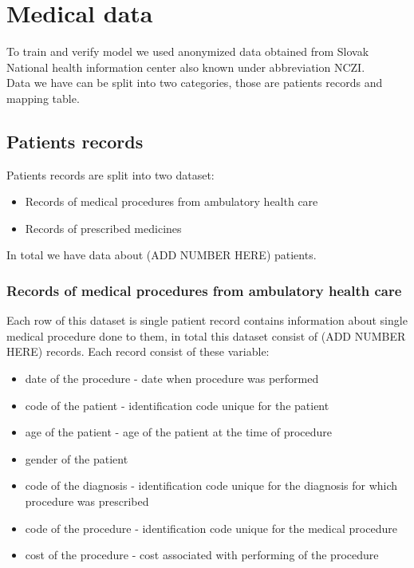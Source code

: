 
\chapter{Medical data} \label{chap:data}

To train and verify model we used anonymized data obtained from Slovak National health information center also known under abbreviation NCZI. 
\\

Data we have can be split into two categories, those are patients records and mapping table. 

\section{Patients records}

Patients records are split into two dataset:
\begin{itemize}
	\item Records of medical procedures from ambulatory health care
	\item Records of prescribed medicines
\end{itemize}

In total we have data about (ADD NUMBER HERE) patients.

\subsection{Records of medical procedures from ambulatory health care}

Each row of this dataset is single patient record contains information about single medical procedure done to them, in total this dataset consist of (ADD NUMBER HERE) records. Each record consist of these variable:
\begin{itemize}
	\item date of the procedure - date when procedure was performed
	\item code of the patient - identification code unique for the patient
	\item age of the patient - age of the patient at the time of procedure
	\item gender of the patient
	\item code of the diagnosis - identification code unique for the diagnosis for which procedure was prescribed
	\item code of the procedure - identification code unique for the medical procedure 
	\item cost of the procedure - cost associated with performing of the procedure
\end{itemize}

